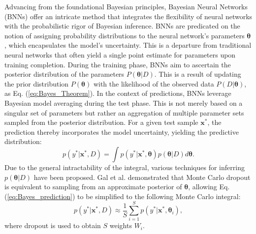 Advancing from the foundational Bayesian principles, Bayesian Neural Networks (BNNs) offer an intricate method that integrates the flexibility of neural networks with the probabilistic rigor of Bayesian inference. 
BNNs are predicated on the notion of assigning probability distributions to the neural network's parameters $\boldsymbol{\theta}$, which encapsulates the model's uncertainty. 
This is a departure from traditional neural networks that often yield a single point estimate for parameters upon training completion.
During the training phase, BNNs aim to ascertain the posterior distribution of the parameters $P(\boldsymbol{\theta}|D)$. 
This is a result of updating the prior distribution $P(\boldsymbol{\theta})$ with the likelihood of the observed data $P(D|\boldsymbol{\theta})$, as Eq. (\ref{eq:Bayes_Theorem}).
In the context of predictions, BNNs leverage Bayesian model averaging during the test phase. 
This is not merely based on a singular set of parameters but rather an aggregation of multiple parameter sets sampled from the posterior distribution. 
For a given test sample $\mathbf{x}^*$, the prediction thereby incorporates the model uncertainty, yielding the predictive distribution:
\begin{equation}
    \label{eq:Bayes_prediction}
    p(y^* | \mathbf{x}^*, D) = \int p(y^* | \mathbf{x}^*, \boldsymbol{\theta}) p(\boldsymbol{\theta} | D) d\boldsymbol{\theta}.
\end{equation}
Due to the general intractability of the integral, various techniques for inferring $p(\boldsymbol{\theta} | D)$ have been proposed. 
Gal et al. \cite{gal2016dropout} demonstrated that Monte Carlo dropout is equivalent to sampling from an approximate posterior of $\boldsymbol{\theta}$, allowing Eq. (\ref{eq:Bayes_prediction}) to be simplified to the following Monte Carlo integral:
\begin{equation}
    \label{eq:Bayes_MC_dropout}
    p(y^* | \mathbf{x}^*, D) \approx \frac{1}{S} \sum^{S}_{i=1} p(y^* | \mathbf{x}^*, \boldsymbol{\theta}_i),
\end{equation}
where dropout is used to obtain $S$ weights $W_i$.

